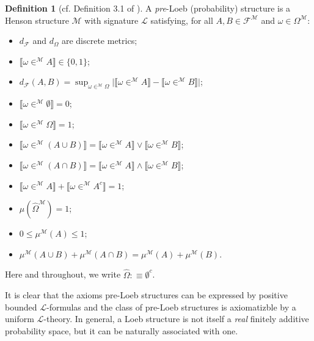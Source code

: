 \documentclass[11pt]{amsart}
\theoremstyle{definition}
\newtheorem{definition}[theorem]{Definition}
\theoremstyle{remark}
\newcommand{\model}[1]{\llbracket {#1} \rrbracket }
\begin{document}
\begin{definition}[cf. Definition 3.1 of \cite{DI2017}]
       A \emph{pre}-Loeb (probability) structure is a Henson structure $\mathcal{M}$ with signature $\mathcal{L}$ satisfying, for all $A, B \in \mathcal{F}^{\mathcal{M}}$ and $\omega \in \Omega^{\mathcal{M}}$:
    \begin{itemize}
        \item $d_{\mathcal{F}}$ and $d_{\Omega}$ are discrete metrics;
        \item $\model{\omega \in^{\mathcal{M}} A} \in \{0,1\}$;
        \item $d_{\mathcal{F}}(A,B) = \sup_{\omega \in^{\mathcal{M}} \Omega} \big| \model{\omega \in^{\mathcal{M}} A} - \model{\omega \in^{\mathcal{M}} B} \big|$;
        \item $\model{\omega \in^{\mathcal{M}} \emptyset} = 0$;
        \item $\model{\omega \in^{\mathcal{M}} \Omega} = 1$;
        \item $\model{\omega \in^{\mathcal{M}} (A \cup B)} = \model{\omega \in^{\mathcal{M}} A} \lor \model{\omega \in^{\mathcal{M}} B}$;
        \item $\model{\omega \in^{\mathcal{M}} (A \cap B)} = \model{\omega \in^{\mathcal{M}} A} \land \model{\omega \in^{\mathcal{M}} B}$;
        \item $\model{\omega \in^{\mathcal{M}} A} + \model{\omega \in^{\mathcal{M}} A^c} = 1$;
        \item $\mu(\hat{\Omega}^\mathcal{M}) = 1$;
        \item $0 \le \mu^{\mathcal{M}}(A) \le 1$;
        \item $\mu^{\mathcal{M}}(A \cup B) + \mu^{\mathcal{M}}(A \cap B) = \mu^{\mathcal{M}}(A) + \mu^{\mathcal{M}}(B)$.
    \end{itemize}
  Here and throughout, we write $\hat{\Omega}:\equiv \emptyset^{c}$.
\end{definition}
It is clear that the axioms pre-Loeb structures can be expressed by positive bounded  $\mathcal{L}$-formulas and the class of pre-Loeb structures is axiomatizble by a uniform $\mathcal{L}$-theory. In general, a Loeb structure is not itself a \emph{real} finitely additive probability space, but it can be naturally associated with one.
\end{document}
